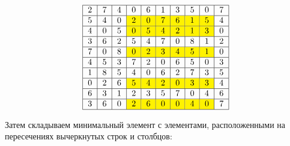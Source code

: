 \documentclass{article}
\begin{document}
\[
    \begin{tabular}{|c|c|c|c|c|c|c|c|c|c|}
        \hline
        2 & 7 & 4 & 0                   & 6                   & 1                   & 3                   & 5                   & 0                   & 7 \\
        \hline
        5 & 4 & 0 & \cellcolor{yellow}2 & \cellcolor{yellow}0 & \cellcolor{yellow}7 & \cellcolor{yellow}6 & \cellcolor{yellow}1 & \cellcolor{yellow}5 & 4 \\
        \hline
        4 & 0 & 5 & \cellcolor{yellow}0 & \cellcolor{yellow}5 & \cellcolor{yellow}4 & \cellcolor{yellow}2 & \cellcolor{yellow}1 & \cellcolor{yellow}3 & 0 \\
        \hline
        3 & 6 & 2 & 5                   & 4                   & 7                   & 0                   & 8                   & 1                   & 2 \\
        \hline
        7 & 0 & 8 & \cellcolor{yellow}0 & \cellcolor{yellow}2 & \cellcolor{yellow}3 & \cellcolor{yellow}4 & \cellcolor{yellow}5 & \cellcolor{yellow}1 & 0 \\
        \hline
        4 & 5 & 3 & 7                   & 2                   & 0                   & 6                   & 5                   & 0                   & 3 \\
        \hline
        1 & 8 & 5 & 4                   & 0                   & 6                   & 2                   & 7                   & 3                   & 5 \\
        \hline
        0 & 2 & 6 & \cellcolor{yellow}5 & \cellcolor{yellow}4 & \cellcolor{yellow}2 & \cellcolor{yellow}0 & \cellcolor{yellow}3 & \cellcolor{yellow}3 & 4 \\
        \hline
        6 & 3 & 1 & 2                   & 3                   & 5                   & 7                   & 0                   & 4                   & 6 \\
        \hline
        3 & 6 & 0 & \cellcolor{yellow}2 & \cellcolor{yellow}6 & \cellcolor{yellow}0 & \cellcolor{yellow}0 & \cellcolor{yellow}4 & \cellcolor{yellow}0 & 7 \\
        \hline
    \end{tabular}
\]

Затем складываем минимальный элемент с элементами, расположенными на пересечениях вычеркнутых строк и столбцов:
\end{document}
